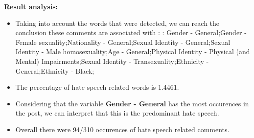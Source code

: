 \documentclass[11pt]{article}
\begin{document}
\textbf{\Large Result analysis:}

\begin{itemize}\item Taking into account the words that were detected, we can reach the conclusion these comments are associated with : : Gender - General;Gender - Female sexuality;Nationality - General;Sexual Identity - General;Sexual Identity - Male homosexuality;Age - General;Physical Identity - Physical (and Mental) Impairments;Sexual Identity - Transexuality;Ethnicity - General;Ethnicity - Black;%

\item The percentage of hate speech related words is 1.4461.

\item Considering that the variable \textbf{Gender - General} has the most occurences in the post, we can interpret that this is the predominant hate speech.

\item Overall there were 94/310 occurences of hate speech related comments.\end{itemize}
\end{document}
